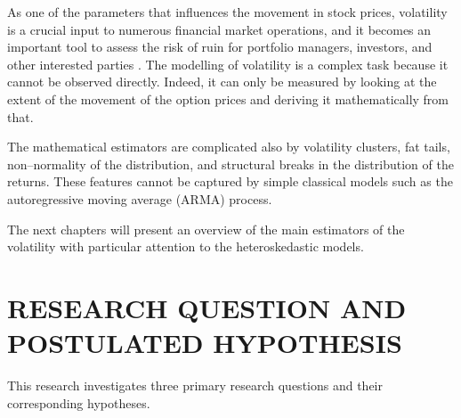 \documentclass[12pt,a4paper]{report}
\numberwithin{equation}{section}
\begin{document}
As one of the parameters that influences the movement in stock prices,
volatility is a crucial input to numerous financial market operations,
and it becomes an important tool to assess the risk of ruin for
portfolio managers, investors, and other interested parties \cite{poon2003forecasting_5}. The
modelling of volatility is a complex task because it cannot be observed
directly. Indeed, it can only be measured by looking at the extent of
the movement of the option prices and deriving it mathematically from
that.

The mathematical estimators are complicated also by volatility clusters,
fat tails, non--normality of the distribution, and structural breaks in
the distribution of the returns. These features cannot be captured by
simple classical models such as the autoregressive moving average (ARMA)
process.

The next chapters will present an overview of the main estimators of
the volatility with particular attention to the heteroskedastic models.

\hypertarget{research--question--and--postulated--hypothesis}{%
\section{\texorpdfstring{\textbf{RESEARCH QUESTION AND POSTULATED
HYPOTHESIS}}{RESEARCH QUESTION AND POSTULATED HYPOTHESIS}}\label{research--question--and--postulated--hypothesis}}

This research investigates three primary research questions and their
corresponding hypotheses.
\end{document}
